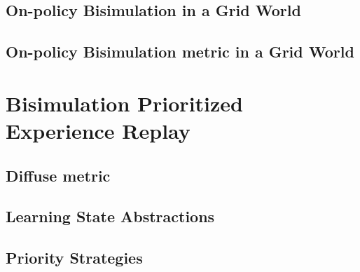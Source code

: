 \subsection{On-policy Bisimulation in a Grid World}

\subsection{On-policy Bisimulation metric in a Grid World}


\section{Bisimulation Prioritized Experience Replay}

\subsection{Diffuse metric}
\subsection{Learning State Abstractions}
\subsection{Priority Strategies}



